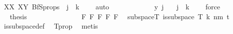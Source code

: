 \begin{isabellebody}
\ XX\ XY\ BfS{\isacharunderscore}{\kern0pt}props{\isacharparenleft}{\kern0pt}{}{\isacharparenright}{\kern0pt}\ {}\ {\isacartoucheopen}j\ {\isacharless}{\kern0pt}\ k\ {\isacharplus}{\kern0pt}\ {}{\isacartoucheclose}\ \isamarkupfalse%
\ auto\isanewline
\ \ \ \ \ \ \ \isamarkupfalse%
\ \isamarkupfalse%
\ {\isachardoublequoteopen}{\isachardot}{\kern0pt}{\isachardot}{\kern0pt}{\isachardot}{\kern0pt}\ {\isacharequal}{\kern0pt}\ y\ j{\isachardoublequoteclose}\ \isamarkupfalse%
\ {}\ {\isacartoucheopen}j\ {\isacharless}{\kern0pt}\ k\ {\isacharplus}{\kern0pt}\ {}{\isacartoucheclose}\ \isamarkupfalse%
\ force\isanewline
\ \ \ \ \ \ \ \isamarkupfalse%
\ \isamarkupfalse%
\ {\isacharquery}{\kern0pt}thesis\ \isacommand{{\isachardot}{\kern0pt}}\isamarkupfalse%
\isanewline
\ \ \ \ \ \isamarkupfalse%
\isanewline
\ \ \ \isamarkupfalse%
\isanewline
\isanewline
\isanewline
\isanewline
\ \ \ \isamarkupfalse%
\ F{}\ F{}\ F{}\ F{}\ F{}\ \isamarkupfalse%
\ subspace{\isacharunderscore}{\kern0pt}T{\isacharcolon}{\kern0pt}\ {\isachardoublequoteopen}is{\isacharunderscore}{\kern0pt}subspace\ T\ {\isacharparenleft}{\kern0pt}k{\isacharplus}{\kern0pt}{}{\isacharparenright}{\kern0pt}\ {\isacharparenleft}{\kern0pt}n{\isacharplus}{\kern0pt}m{\isacharparenright}{\kern0pt}\ {\isacharparenleft}{\kern0pt}t{\isacharplus}{\kern0pt}{}{\isacharparenright}{\kern0pt}{\isachardoublequoteclose}\ \isamarkupfalse%
\ is{\isacharunderscore}{\kern0pt}subspace{\isacharunderscore}{\kern0pt}def\ \isamarkupfalse%
\ T{\isacharunderscore}{\kern0pt}prop\ \isamarkupfalse%
\ metis\isanewline
\isanewline
\isanewline
\isanewline
\isanewline
\isanewline
\isanewline
\isanewline
\isanewline
\ \ \ \ \isamarkupfalse%

\end{isabellebody}
